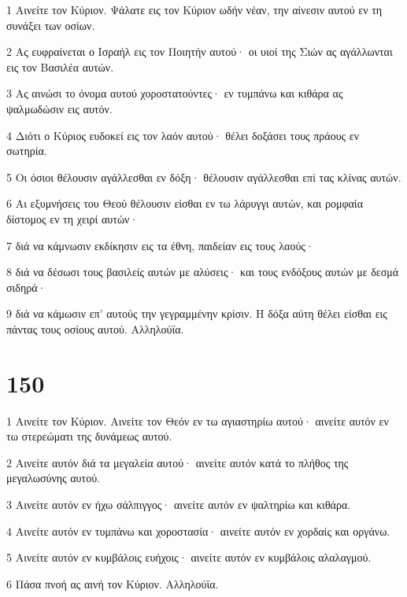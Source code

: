 \par 1 Αινείτε τον Κύριον. Ψάλατε εις τον Κύριον ωδήν νέαν, την αίνεσιν αυτού εν τη συνάξει των οσίων.
\par 2 Ας ευφραίνεται ο Ισραήλ εις τον Ποιητήν αυτού· οι υιοί της Σιών ας αγάλλωνται εις τον Βασιλέα αυτών.
\par 3 Ας αινώσι το όνομα αυτού χοροστατούντες· εν τυμπάνω και κιθάρα ας ψαλμωδώσιν εις αυτόν.
\par 4 Διότι ο Κύριος ευδοκεί εις τον λαόν αυτού· θέλει δοξάσει τους πράους εν σωτηρία.
\par 5 Οι όσιοι θέλουσιν αγάλλεσθαι εν δόξη· θέλουσιν αγάλλεσθαι επί τας κλίνας αυτών.
\par 6 Αι εξυμνήσεις του Θεού θέλουσιν είσθαι εν τω λάρυγγι αυτών, και ρομφαία δίστομος εν τη χειρί αυτών·
\par 7 διά να κάμνωσιν εκδίκησιν εις τα έθνη, παιδείαν εις τους λαούς·
\par 8 διά να δέσωσι τους βασιλείς αυτών με αλύσεις· και τους ενδόξους αυτών με δεσμά σιδηρά·
\par 9 διά να κάμωσιν επ' αυτούς την γεγραμμένην κρίσιν. Η δόξα αύτη θέλει είσθαι εις πάντας τους οσίους αυτού. Αλληλούϊα.

\chapter{150}

\par 1 Αινείτε τον Κύριον. Αινείτε τον Θεόν εν τω αγιαστηρίω αυτού· αινείτε αυτόν εν τω στερεώματι της δυνάμεως αυτού.
\par 2 Αινείτε αυτόν διά τα μεγαλεία αυτού· αινείτε αυτόν κατά το πλήθος της μεγαλωσύνης αυτού.
\par 3 Αινείτε αυτόν εν ήχω σάλπιγγος· αινείτε αυτόν εν ψαλτηρίω και κιθάρα.
\par 4 Αινείτε αυτόν εν τυμπάνω και χοροστασία· αινείτε αυτόν εν χορδαίς και οργάνω.
\par 5 Αινείτε αυτόν εν κυμβάλοις ευήχοις· αινείτε αυτόν εν κυμβάλοις αλαλαγμού.
\par 6 Πάσα πνοή ας αινή τον Κύριον. Αλληλούϊα.


